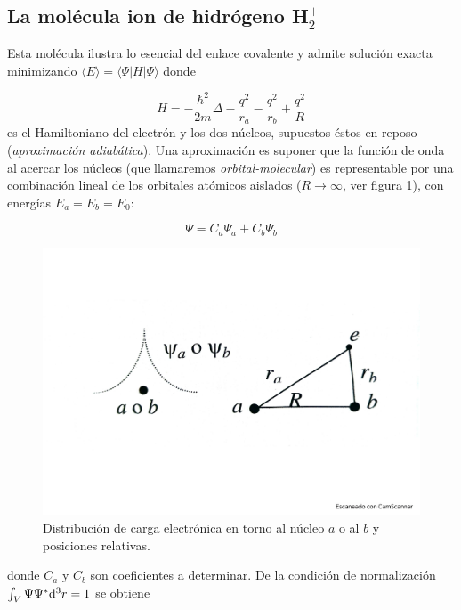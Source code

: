 \subsection{La molécula ion de hidrógeno H$_2^+$} \label{Subsec:03-04-01}

Esta molécula ilustra lo esencial del enlace covalente y admite solución exacta minimizando $\langle E \rangle = \langle \Psi | H | \Psi \rangle$ donde 

\begin{equation*}
    H = - \frac{\hbar^2}{2m} \Delta - \frac{q^2}{r_a} - \frac{q^2}{r_b} + \frac{q^2}{R}
\end{equation*}
es el Hamiltoniano del electrón y los dos núcleos, supuestos éstos en reposo (\textit{aproximación adiabática}). Una aproximación es suponer que la función de onda al acercar los núcleos (que llamaremos \textit{orbital-molecular}) es representable por una combinación lineal de los orbitales atómicos aislados ($R \rightarrow \infty$, ver figura \ref{Fig:03-04}), con energías $E_a = E_b = E_0$:

\begin{equation}
    \Psi = C_a \Psi_a + C_b \Psi_b \label{Ec:03-04-01}
\end{equation}

\begin{figure}[h!] \centering
    \includegraphics[scale=0.4]{Cuerpo/Ch_03/Fotos libro 3.pdf}
    \caption{Distribución de carga electrónica en torno al núcleo $a$ o al $b$ y posiciones relativas.}
    \label{Fig:03-04}
\end{figure}    


donde $C_a$ y $C_b$ son coeficientes a determinar. De la condición de normalización $\int_V \Psi \Psi^* \mathrm{d}^3 r = 1$ se obtiene 

